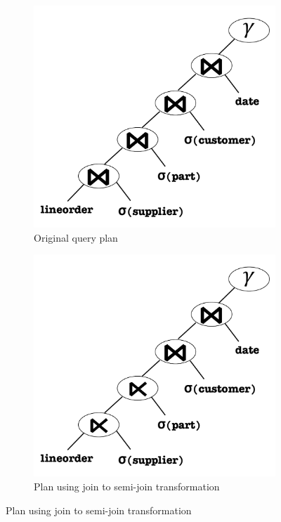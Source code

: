 \begin{figure}[t]
\centering
\begin{subfigure}[bt]{0.33\textwidth}
  \centering
   \includegraphics[width=1.0\columnwidth,
                    height=0.75\columnwidth]{system/figures/Q41-original.pdf}
   \caption{Original query plan}
   \label{fig-q41-original}
\end{subfigure} %
\begin{subfigure}[bt]{0.33\textwidth}
  \centering
   \includegraphics[width=1.0\columnwidth,
                    height=0.75\columnwidth]{system/figures/Q41-semijoin.pdf}
   \caption{Plan using join to semi-join transformation}
   \label{fig-q41-semijoin}
\end{subfigure} %

\end{figure}
